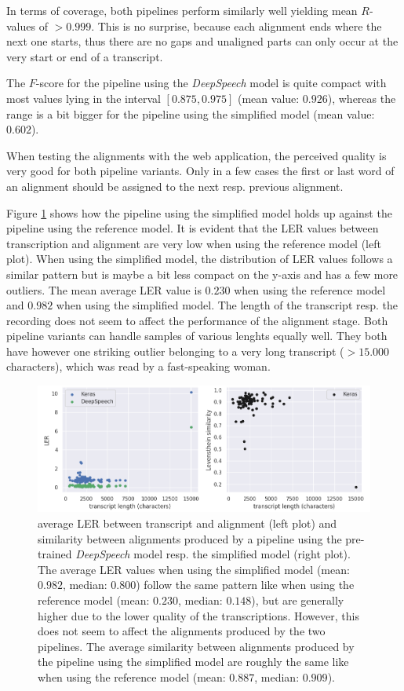In terms of coverage, both pipelines perform similarly well yielding mean $R$-values of $>0.999$. This is no surprise, because each alignment ends where the next one starts, thus there are no gaps and unaligned parts can only occur at the very start or end of a transcript. 

The $F$-score for the pipeline using the \textit{DeepSpeech} model is quite compact with most values lying in the interval $[0.875, 0.975]$ (mean value: $0.926$), whereas the range is a bit bigger for the pipeline using the simplified model (mean value: $0.602$).

When testing the alignments with the web application, the perceived quality is very good for both pipeline variants. Only in a few cases the first or last word of an alignment should be assigned to the next resp. previous alignment.

Figure \ref{pipeline_scatterplot_ls_en} shows how the pipeline using the simplified model holds up against the pipeline using the reference model. It is evident that the \ac{LER} values between transcription and alignment are very low when using the reference model (left plot). When using the simplified model, the distribution of \ac{LER} values follows a similar pattern but is maybe a bit less compact on the y-axis and has a few more outliers. The mean average \ac{LER} value is $0.230$ when using the reference model and $0.982$ when using the simplified model. The length of the transcript resp. the recording does not seem to affect the performance of the alignment stage. Both pipeline variants can handle samples of various lenghts equally well. They both have however one striking outlier belonging to a very long transcript ($>15.000$ characters), which was read by a fast-speaking woman. 

\begin{figure}[h!]
	\includegraphics[width=\linewidth]{./img/scatterplot_ls.png}
	\caption{average \ac{LER} between transcript and alignment (left plot) and similarity between alignments produced by a pipeline using the pre-trained \textit{DeepSpeech} model resp. the simplified model (right plot). The average \ac{LER} values when using the simplified model (mean: $0.982$, median: $0.800$) follow the same pattern like when using the reference model (mean: $0.230$, median: $0.148$), but are generally higher due to the lower quality of the transcriptions. However, this does not seem to affect the alignments produced by the two pipelines. The average similarity between alignments produced by the pipeline using the simplified model are roughly the same like when using the reference model (mean: $0.887$, median: $0.909$).}
	\label{pipeline_scatterplot_ls_en}
\end{figure}

